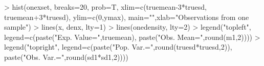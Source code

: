\begin{Schunk}
\begin{Sinput}
> hist(onexset, breaks=20, prob=T, xlim=c(truemean-3*truesd, truemean+3*truesd), ylim=c(0,ymax),   main="",xlab="Observations from one sample")
> lines(x, denx, lty=1)
> lines(onedensity, lty=2)
> legend("topleft", legend=c(paste("Exp. Value=",truemean), paste("Obs. Mean=",round(m1,2))))
> legend("topright", legend=c(paste("Pop. Var.=",round(truesd*truesd,2)), paste("Obs. Var.=",round(sd1*sd1,2))))
\end{Sinput}
\end{Schunk}
